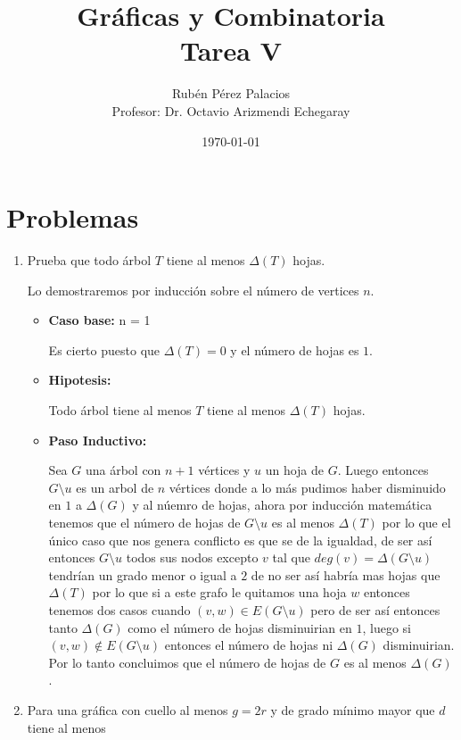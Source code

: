 \documentclass[letterpaper]{article}
\title{Gráficas y Combinatoria\\Tarea V}
\author{Rubén Pérez Palacios\\Profesor: Dr. Octavio Arizmendi Echegaray}
\date{\today}
\newcommand{\1}{\mathbbm{1}}
\begin{document}
	\maketitle
    
    \section*{Problemas}

    \begin{enumerate}
		
		\item Prueba que todo árbol $T$ tiene al menos $\Delta(T)$ hojas.
		
		Lo demostraremos por inducción sobre el número de vertices $n$.

		\begin{itemize}
			\item \textbf{Caso base:} n = 1
			
			Es cierto puesto que $\Delta(T) = 0$ y el número de hojas es $1$.

			\item \textbf{Hipotesis:}
			
			Todo árbol tiene al menos $T$ tiene al menos $\Delta(T)$ hojas.

			\item \textbf{Paso Inductivo:}
			
			Sea $G$ una árbol con $n+1$ vértices y $u$ un hoja de $G$. Luego entonces $G\setminus u$ es un arbol de $n$ vértices donde a lo más pudimos haber disminuido en $1$ a $\Delta(G)$ y al núemro de hojas, ahora por inducción matemática tenemos que el número de hojas de $G\setminus u$ es al menos $\Delta(T)$ por lo que el único caso que nos genera conflicto es que se de la igualdad, de ser así entonces $G\setminus u$ todos sus nodos excepto $v$ tal que $deg(v) = \Delta(G\setminus u)$ tendrían un grado menor o igual a $2$ de no ser así habría mas hojas que $\Delta(T)$ por lo que si a este grafo le quitamos una hoja $w$ entonces tenemos dos casos cuando $(v,w) \in E(G\setminus u)$ pero de ser así entonces tanto $\Delta(G)$ como el número de hojas disminuirian en $1$, luego si $(v,w) \not\in E(G\setminus u)$ entonces el número de hojas ni $\Delta(G)$ disminuirian. Por lo tanto concluimos que el número de hojas de $G$ es al menos $\Delta(G)$.
		
		\end{itemize}

		\item Para una gráfica con cuello al menos $g  = 2r$ y de grado mínimo mayor que $d$ tiene al menos
		

\end{enumerate}
\end{document}
